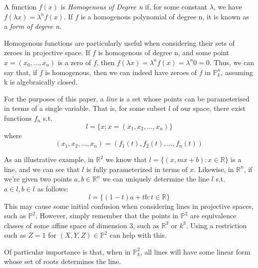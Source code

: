 \begin{mydef}
A function $f(x)$ is \emph{Homogenous of Degree n} if, for some 
constant $\lambda$, we have $f(\lambda x) = \lambda ^n f(x)$.
If $f$ is a homogenous polynomial of degree n, it is known as a \emph{form of degree n}.
\end{mydef}

Homogenous functions are particularly useful when considering their
sets of zeroes in projective space. If $f$ is homogenous of degree
n, and some point $x = (x_0, ..., x_n)$ is a zero of $f$, then
$f(\lambda x) = \lambda^n f(x) = \lambda^n 0 = 0$. Thus, we can say
that, if $f$ is homogenous, then we can indeed have zeroes of $f$ in $\mathbb{P}^n_k$,
assuming k is algebraically closed.

\begin{mydef}
For the purposes of this paper, a \emph{line} is a set whose points can be parameterised in terms
of a single variable. That is, for some subset $l$ of our space, there exist functions $f_n$ s.t.
\[
	l = \{x : x = (x_1, x_2, \dots, x_n)\}
\]
where
\[
	(x_1, x_2, \dots, x_n) = (f_1(t), f_2(t), \dots, f_n(t))
\]
\end{mydef}

As an illustrative example, in $\mathbb{R}^2$ we know that 
$l = \{(x,mx+b):x\in\mathbb{R}\}$ is a line, and we can see that
$l$ is fully parameterized in terms of $x$. Likewise, in $\mathbb{R}^n$,
if we're given two points $a, b \in \mathbb{R}^n$ we can uniquely
determine the line $l$ s.t. $a \in l, b \in l$ as follows:
\[
	l = \{ (1-t)a + tb : t \in \mathbb{R}\}
\]
This may cause some initial confusion when considering lines in projective
spaces, such as $\mathbb{P}^2$. However, simply remember that the points in
$\mathbb{P}^2$ are equivalence classes of some affine space of dimension $3$,
such as $\mathbb{R}^3$ or $k^3$. Using a restriction such as $Z=1$ for
$(X,Y,Z) \in \mathbb{P}^2$ can help with this.

Of particular importance is that, when in $\mathbb{P}^2_k$, all lines will have
some linear form whose set of roots determines the line.
